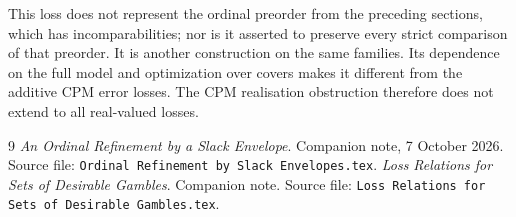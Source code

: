 \documentclass[11pt]{article}
\theoremstyle{remark}
\begin{document}
This loss does not represent the ordinal preorder from the preceding sections,
which has incomparabilities; nor is it asserted to preserve every strict
comparison of that preorder. It is another construction on the same families.
Its dependence on the full model and optimization over covers makes it different
from the additive CPM error losses. The CPM realisation obstruction therefore
does not extend to all real-valued losses.

\begin{thebibliography}{9}
 \emph{An Ordinal Refinement by a Slack Envelope}.
Companion note, 7 October 2026. Source file:
\texttt{Ordinal Refinement by Slack Envelopes.tex}.
 \emph{Loss Relations for Sets of Desirable Gambles}.
Companion note. Source file:
\texttt{Loss Relations for Sets of Desirable Gambles.tex}.
\end{thebibliography}
\end{document}
